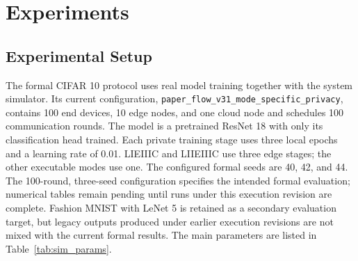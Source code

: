 \documentclass[5p,times]{elsarticle}
\theoremstyle{plain}
\theoremstyle{definition}
\theoremstyle{remark}
\newcommand{\tabref}[1]{Table~\ref{#1}}
\begin{document}
\section{Experiments}
\label{sec:experiment}
\subsection{Experimental Setup}
\label{sec:exp_setup}
The formal CIFAR 10 protocol uses real model training together with the system
simulator. Its current configuration, \texttt{paper\_flow\_v31\_mode\_specific\_privacy},
contains 100 end devices, 10 edge nodes, and one cloud node and schedules 100
communication rounds. The model is a pretrained ResNet 18 with only its
classification head trained. Each private training stage uses three local epochs
and a learning rate of 0.01. LIEIIIC and LIIEIIIC use three edge stages; the
other executable modes use one. The configured formal seeds are 40, 42, and 44.
The 100-round, three-seed configuration specifies the intended formal evaluation;
numerical tables remain pending until runs under this execution revision are
complete. Fashion MNIST with LeNet 5 is retained as a secondary evaluation target,
but legacy outputs produced under earlier execution revisions are not mixed with
the current formal results. The main parameters are listed in
\tabref{tab:sim_params}.
\end{document}
